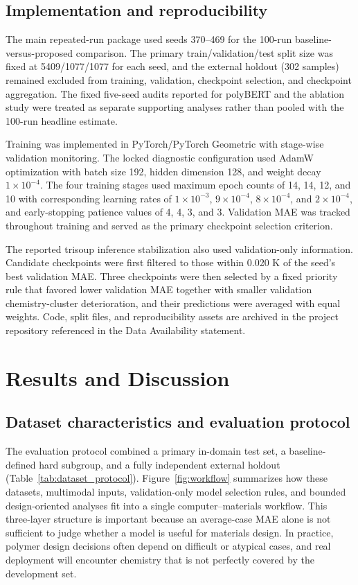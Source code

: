 \documentclass[review,12pt]{elsarticle}
\begin{document}
\subsection{Implementation and reproducibility}

The main repeated-run package used seeds 370--469 for the 100-run baseline-versus-proposed comparison. The primary train/validation/test split size was fixed at 5409/1077/1077 for each seed, and the external holdout (302 samples) remained excluded from training, validation, checkpoint selection, and checkpoint aggregation. The fixed five-seed audits reported for polyBERT and the ablation study were treated as separate supporting analyses rather than pooled with the 100-run headline estimate.

Training was implemented in PyTorch/PyTorch Geometric with stage-wise validation monitoring. The locked diagnostic configuration used AdamW optimization with batch size 192, hidden dimension 128, and weight decay $1\times 10^{-4}$. The four training stages used maximum epoch counts of 14, 14, 12, and 10 with corresponding learning rates of $1\times 10^{-3}$, $9\times 10^{-4}$, $8\times 10^{-4}$, and $2\times 10^{-4}$, and early-stopping patience values of 4, 4, 3, and 3. Validation MAE was tracked throughout training and served as the primary checkpoint selection criterion.

The reported trisoup inference stabilization also used validation-only information. Candidate checkpoints were first filtered to those within 0.020 K of the seed's best validation MAE. Three checkpoints were then selected by a fixed priority rule that favored lower validation MAE together with smaller validation chemistry-cluster deterioration, and their predictions were averaged with equal weights. Code, split files, and reproducibility assets are archived in the project repository referenced in the Data Availability statement.

\section{Results and Discussion}

\subsection{Dataset characteristics and evaluation protocol}

The evaluation protocol combined a primary in-domain test set, a baseline-defined hard subgroup, and a fully independent external holdout (Table~\ref{tab:dataset_protocol}). Figure~\ref{fig:workflow} summarizes how these datasets, multimodal inputs, validation-only model selection rules, and bounded design-oriented analyses fit into a single computer--materials workflow. This three-layer structure is important because an average-case MAE alone is not sufficient to judge whether a model is useful for materials design. In practice, polymer design decisions often depend on difficult or atypical cases, and real deployment will encounter chemistry that is not perfectly covered by the development set.
\end{document}
